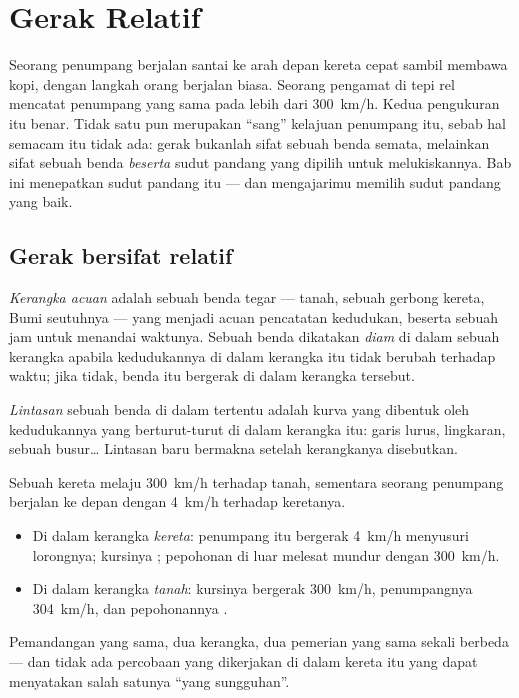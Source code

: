 \chapter{Gerak Relatif}\label{ch:g10:relative-motion}

Seorang penumpang berjalan santai ke arah depan kereta cepat sambil
membawa kopi, dengan langkah orang berjalan biasa. Seorang pengamat di
tepi rel mencatat penumpang yang sama pada lebih dari \qty{300}{km/h}.
Kedua pengukuran itu benar. Tidak satu pun merupakan ``sang'' kelajuan
penumpang itu, sebab hal semacam itu tidak ada: gerak bukanlah sifat
sebuah benda semata, melainkan sifat sebuah benda \emph{beserta} sudut
pandang yang dipilih untuk melukiskannya. Bab ini menepatkan sudut
pandang itu --- dan mengajarimu memilih sudut pandang yang baik.

\section{Gerak bersifat relatif}

\begin{definition}\label{def:g10:relative-motion:frame}
\emph{Kerangka acuan} adalah sebuah benda tegar
--- tanah, sebuah gerbong kereta, Bumi seutuhnya --- yang menjadi acuan
pencatatan kedudukan, beserta sebuah jam untuk menandai waktunya. Sebuah
benda dikatakan \emph{diam} di dalam sebuah kerangka apabila
kedudukannya di dalam kerangka itu tidak berubah terhadap waktu; jika
tidak, benda itu bergerak di dalam kerangka tersebut.
\end{definition}

\begin{definition}[Lintasan]\label{def:g10:relative-motion:trajectory}
\emph{Lintasan} sebuah benda di dalam 
tertentu adalah kurva yang dibentuk oleh kedudukannya yang
berturut-turut di dalam kerangka itu: garis lurus, lingkaran, sebuah
busur\dots{} Lintasan baru bermakna setelah kerangkanya disebutkan.
\end{definition}

\begin{example}\label{ex:g10:relative-motion:walker}
Sebuah kereta melaju \qty{300}{km/h} terhadap tanah, sementara seorang
penumpang berjalan ke depan dengan \qty{4}{km/h} terhadap keretanya.
\begin{itemize}
  \item Di dalam kerangka \emph{kereta}: penumpang itu bergerak
        \qty{4}{km/h} menyusuri lorongnya; kursinya ; pepohonan di
        luar melesat mundur dengan \qty{300}{km/h}.
  \item Di dalam kerangka \emph{tanah}: kursinya bergerak
        \qty{300}{km/h}, penumpangnya \qty{304}{km/h}, dan pepohonannya
        .
\end{itemize}
Pemandangan yang sama, dua kerangka, dua pemerian yang sama sekali
berbeda --- dan tidak ada percobaan yang dikerjakan di dalam kereta itu
yang dapat menyatakan salah satunya ``yang sungguhan''.
\end{example}

